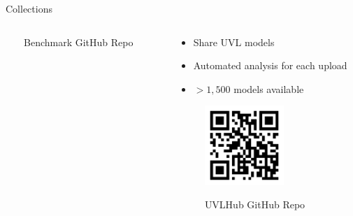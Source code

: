 \documentclass[
	aspectratio=169, %
	8pt, %
	nosectionframes, %
]{beamer}
\newcommand{\inlinesubtitle}[1]{\textcolor{gray!60}{~{}~#1}}
\begin{document}
\begin{frame}{\insertsection \inlinesubtitle{Collections}}
\begin{columns}[t]
\begin{column}{0.3\textwidth}
\begin{figure}
                Benchmark GitHub Repo
            \end{figure}
		\end{column}
        \begin{column}{0.3\textwidth}
            \begin{itemize}
                \item Share UVL models
                \item Automated analysis for each upload
                \item $>1,500$ models available  
            \end{itemize}
            \begin{figure}
                \centering
                \includegraphics[width=3cm]{pics/qr/uvlhub.pdf}
                
                UVLHub GitHub Repo
            \end{figure}
        \end{column}
	\end{columns}
\end{frame}
\end{document}
